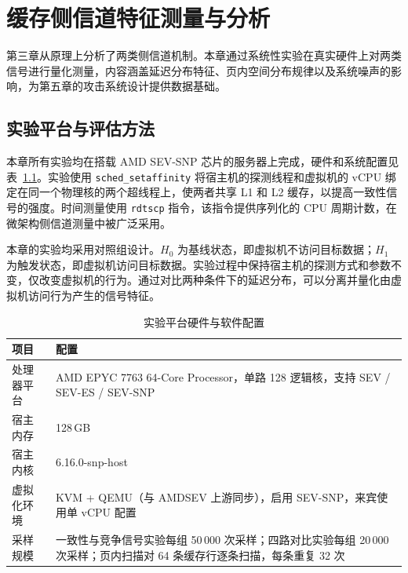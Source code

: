 
\chapter{缓存侧信道特征测量与分析}
\label{chap:channel}

第三章从原理上分析了两类侧信道机制。本章通过系统性实验在真实硬件上对两类信号进行量化测量，内容涵盖延迟分布特征、页内空间分布规律以及系统噪声的影响，为第五章的攻击系统设计提供数据基础。

\section{实验平台与评估方法}

本章所有实验均在搭载 AMD SEV-SNP 芯片的服务器上完成，硬件和系统配置见表~\ref{tab:exp42_setup}。实验使用 \texttt{sched\_setaffinity} 将宿主机的探测线程和虚拟机的 vCPU 绑定在同一个物理核的两个超线程上，使两者共享 L1 和 L2 缓存，以提高一致性信号的强度。时间测量使用 \texttt{rdtscp} 指令，该指令提供序列化的 CPU 周期计数，在微架构侧信道测量中被广泛采用。

本章的实验均采用对照组设计。$H_0$ 为基线状态，即虚拟机不访问目标数据；$H_1$ 为触发状态，即虚拟机访问目标数据。实验过程中保持宿主机的探测方式和参数不变，仅改变虚拟机的行为。通过对比两种条件下的延迟分布，可以分离并量化由虚拟机访问行为产生的信号特征。

\begin{table}[htbp]
  \centering
  \renewcommand{\arraystretch}{1.2}
  \caption{实验平台硬件与软件配置}
  \label{tab:exp42_setup}
  \setlength{\tabcolsep}{6pt}
  \begin{tabular}{p{3.0cm}p{10.2cm}}
    \hline
    项目 & 配置 \\
    \hline
    处理器平台 & AMD EPYC 7763 64-Core Processor，单路 128 逻辑核，支持 SEV / SEV-ES / SEV-SNP \\
    宿主内存   & 128\,GB \\
    宿主内核   & 6.16.0-snp-host \\
    虚拟化环境 & KVM + QEMU（与 AMDSEV 上游同步），启用 SEV-SNP，来宾使用单 vCPU 配置 \\
    采样规模   & 一致性与竞争信号实验每组 50\,000 次采样；四路对比实验每组 20\,000 次采样；页内扫描对 64 条缓存行逐条扫描，每条重复 32 次 \\
    \hline
  \end{tabular}
\end{table}

